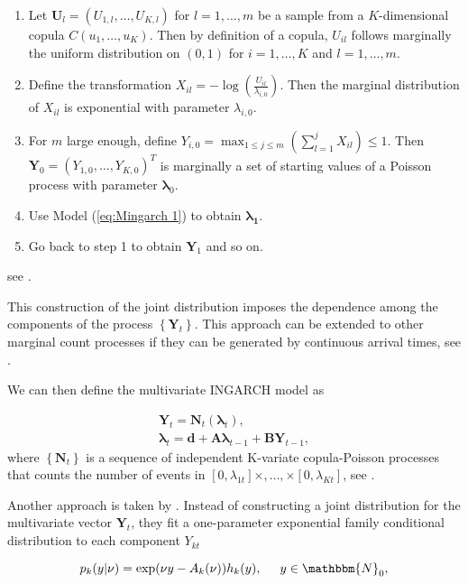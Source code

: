 \begin{enumerate}
	\item Let $\bm{U}_l=(U_{1,l},\ldots,U_{K,l})$ for $l=1,\ldots,m$ be a sample from a $K$-dimensional copula $C(u_1,\ldots,u_K)$. Then by definition of a copula, $U_{il}$ follows marginally the uniform distribution on $(0,1)$ for $i=1,\ldots,K$ and $l=1,\ldots,m$. 
	\item Define the transformation $X_{il} = -\log (\frac{U_{il}}{\lambda_{i,0}})$. Then the marginal distribution of $X_{il}$ is exponential with parameter $\lambda_{i,0}$. 
	\item For $m$ large enough, define $Y_{i,0} = \max_{1\leq j \leq m}(\sum_{l=1}^j X_{il})\leq 1$. Then $\bm{Y}_0=(Y_{1,0},\ldots,Y_{K,0})^T$ is marginally a set of starting values of a Poisson process with parameter $\bm{\lambda}_0$. 
	\item Use Model (\ref{eq:Mingarch 1}) to obtain $\bm{\lambda_1}$.
	\item Go back to step 1 to obtain $\bm{Y}_1$ and so on. 
\end{enumerate}
%
see \textcite{Fokianos:2020}.

This construction of the joint distribution imposes the dependence among the components of the process $\left\{\bm{Y}_t\right\}$. This approach can be extended to other marginal count processes if they can be generated by continuous arrival times, see \textcite{Fokianos:2020}. 

We can then define the multivariate INGARCH model as

\begin{equation}
\begin{gathered}
\bm{Y}_t = \bm{N}_t(\bm{\lambda}_t), \\
\bm{\lambda}_t = \bm{d} + \bm{A}\bm{\lambda}_{t-1} + \bm{B}\bm{Y}_{t-1},
\label{eq:Mingarch 1 new}
\end{gathered}
\end{equation}
%
where $\left\{\bm{N}_t\right\}$ is a sequence of independent K-variate copula-Poisson processes that counts the number of events in $[0,\lambda_{1t}]\times,\ldots,\times[0,\lambda_{Kt}]$, see \textcite{Fokianos:2020}. 

Another approach is taken by \textcite{Lee:2023}. Instead of constructing a joint distribution for the multivariate vector $\bm{Y}_t$, they fit a one-parameter exponential family conditional distribution to each component $Y_{kt}$

\begin{equation}
p_{k}(y|\nu) = \exp(\nu y - A_k(\nu))h_k(y), \hspace{0.5cm} y \in \mathbbm{N}_0,
\label{eq:Exponential Family}
\end{equation}

